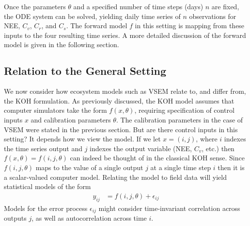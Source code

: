 \documentclass[12pt]{article}
\begin{document}
Once the parameters $\theta$ and a specified number of time steps (days) $n$ are fixed, the ODE system can be solved, yielding daily time series of $n$
observations for NEE, $C_v$, $C_r$, and $C_s$. The forward model $f$ in this setting is mapping from these inputs to the four resulting time series. A more 
detailed discussion of the forward model is given in the following section. 

\subsection{Relation to the General Setting}
We now consider how ecosystem models such as VSEM relate to, and differ from, the KOH formulation. As previously discussed, the KOH model assumes that
computer simulators take the form $f(x, \theta)$, requiring specification of control inputs $x$ and calibration parameters $\theta$. The calibration parameters 
in the case of VSEM were stated in the previous section. But are there control inputs in this setting? It depends how we view the model. If we let 
$x = (i, j)$, where $i$ indexes the time series output and $j$ indexes the output variable (NEE, $C_v$, etc.) then $f(x, \theta) = f(i, j, \theta)$ can indeed be thought of in the 
classical KOH sense. Since $f(i, j, \theta)$ maps to the value of a single output $j$ at a single time step $i$ then it is a scalar-valued computer model. Relating the 
model to field data will yield statistical models of the form 
\begin{align}
y_{ij} &= f(i, j, \theta) + \epsilon_{ij} \label{ij_model}
\end{align}
Models for the error process $\epsilon_{ij}$ might consider time-invariant correlation across outputs $j$, as well as autocorrelation across time $i$. 
\end{document}
